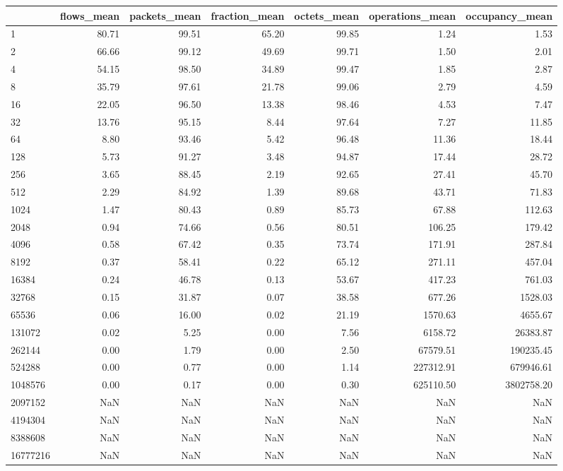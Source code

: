 \begin{tabular}{lrrrrrr}
\toprule
 & flows_mean & packets_mean & fraction_mean & octets_mean & operations_mean & occupancy_mean \\
\midrule
1 & 80.71 & 99.51 & 65.20 & 99.85 & 1.24 & 1.53 \\
2 & 66.66 & 99.12 & 49.69 & 99.71 & 1.50 & 2.01 \\
4 & 54.15 & 98.50 & 34.89 & 99.47 & 1.85 & 2.87 \\
8 & 35.79 & 97.61 & 21.78 & 99.06 & 2.79 & 4.59 \\
16 & 22.05 & 96.50 & 13.38 & 98.46 & 4.53 & 7.47 \\
32 & 13.76 & 95.15 & 8.44 & 97.64 & 7.27 & 11.85 \\
64 & 8.80 & 93.46 & 5.42 & 96.48 & 11.36 & 18.44 \\
128 & 5.73 & 91.27 & 3.48 & 94.87 & 17.44 & 28.72 \\
256 & 3.65 & 88.45 & 2.19 & 92.65 & 27.41 & 45.70 \\
512 & 2.29 & 84.92 & 1.39 & 89.68 & 43.71 & 71.83 \\
1024 & 1.47 & 80.43 & 0.89 & 85.73 & 67.88 & 112.63 \\
2048 & 0.94 & 74.66 & 0.56 & 80.51 & 106.25 & 179.42 \\
4096 & 0.58 & 67.42 & 0.35 & 73.74 & 171.91 & 287.84 \\
8192 & 0.37 & 58.41 & 0.22 & 65.12 & 271.11 & 457.04 \\
16384 & 0.24 & 46.78 & 0.13 & 53.67 & 417.23 & 761.03 \\
32768 & 0.15 & 31.87 & 0.07 & 38.58 & 677.26 & 1528.03 \\
65536 & 0.06 & 16.00 & 0.02 & 21.19 & 1570.63 & 4655.67 \\
131072 & 0.02 & 5.25 & 0.00 & 7.56 & 6158.72 & 26383.87 \\
262144 & 0.00 & 1.79 & 0.00 & 2.50 & 67579.51 & 190235.45 \\
524288 & 0.00 & 0.77 & 0.00 & 1.14 & 227312.91 & 679946.61 \\
1048576 & 0.00 & 0.17 & 0.00 & 0.30 & 625110.50 & 3802758.20 \\
2097152 & NaN & NaN & NaN & NaN & NaN & NaN \\
4194304 & NaN & NaN & NaN & NaN & NaN & NaN \\
8388608 & NaN & NaN & NaN & NaN & NaN & NaN \\
16777216 & NaN & NaN & NaN & NaN & NaN & NaN \\
\bottomrule
\end{tabular}
